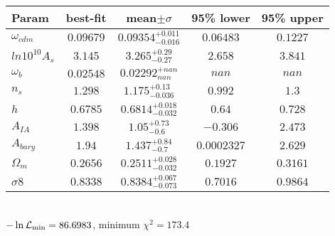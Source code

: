 \begin{tabular}{|l|c|c|c|c|} 
 \hline 
Param & best-fit & mean$\pm\sigma$ & 95\% lower & 95\% upper \\ \hline 
$\omega_{cdm }$ &$0.09679$ & $0.09354_{-0.016}^{+0.011}$ & $0.06483$ & $0.1227$ \\ 
$ln10^{10}A_{s }$ &$3.145$ & $3.265_{-0.27}^{+0.29}$ & $2.658$ & $3.841$ \\ 
$\omega_{b }$ &$0.02548$ & $0.02292_{nan}^{+nan}$ & $nan$ & $nan$ \\ 
$n_{s }$ &$1.298$ & $1.175_{-0.036}^{+0.13}$ & $0.992$ & $1.3$ \\ 
$h$ &$0.6785$ & $0.6814_{-0.032}^{+0.018}$ & $0.64$ & $0.728$ \\ 
$A_{IA }$ &$1.398$ & $1.05_{-0.6}^{+0.73}$ & $-0.306$ & $2.473$ \\ 
$A_{bary }$ &$1.94$ & $1.437_{-0.7}^{+0.84}$ & $0.0002327$ & $2.629$ \\ 
$\Omega_{m }$ &$0.2656$ & $0.2511_{-0.032}^{+0.028}$ & $0.1927$ & $0.3161$ \\ 
$\sigma8$ &$0.8338$ & $0.8384_{-0.073}^{+0.067}$ & $0.7016$ & $0.9864$ \\ 
\hline 
 \end{tabular} \\ 
$-\ln{\cal L}_\mathrm{min} =86.6983$, minimum $\chi^2=173.4$ \\ 
